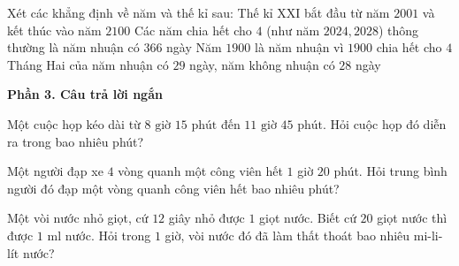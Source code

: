\begin{ex} %
Xét các khẳng định về năm và thế kỉ sau:
\choiceTF
{\True Thế kỉ XXI bắt đầu từ năm $2001$ và kết thúc vào năm $2100$}
{\True Các năm chia hết cho $4$ (như năm $2024, 2028$) thông thường là năm nhuận có $366$ ngày}
{Năm $1900$ là năm nhuận vì $1900$ chia hết cho $4$}
{\True Tháng Hai của năm nhuận có $29$ ngày, năm không nhuận có $28$ ngày}
\end{ex}

\textbf{Phần 3. Câu trả lời ngắn}

\begin{ex} %
Một cuộc họp kéo dài từ $8\text{ giờ } 15\text{ phút}$ đến $11\text{ giờ } 45\text{ phút}$. Hỏi cuộc họp đó diễn ra trong bao nhiêu phút?
\end{ex}

\begin{ex} %
Một người đạp xe $4$ vòng quanh một công viên hết $1$ giờ $20$ phút. Hỏi trung bình người đó đạp một vòng quanh công viên hết bao nhiêu phút?
\end{ex}

\begin{ex} %
Một vòi nước nhỏ giọt, cứ $12$ giây nhỏ được $1$ giọt nước. Biết cứ $20$ giọt nước thì được $1\text{ ml}$ nước. Hỏi trong $1$ giờ, vòi nước đó đã làm thất thoát bao nhiêu mi-li-lít nước?
\end{ex}

